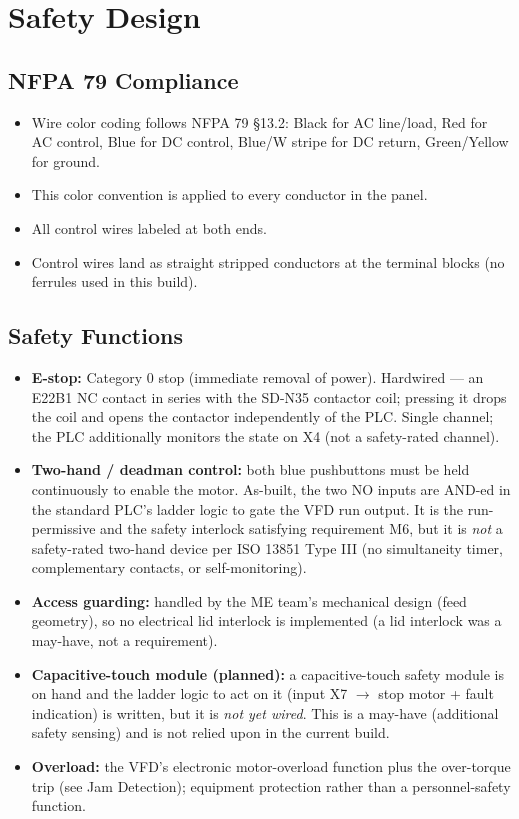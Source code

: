 \documentclass[hidelinks,12pt]{article}
\begin{document}
\section{Safety Design}

\subsection{NFPA 79 Compliance}
\begin{itemize}
    \item Wire color coding follows NFPA 79 §13.2: Black for AC line/load, Red for AC control, Blue for DC control, Blue/W stripe for DC return, Green/Yellow for ground.
    \item This color convention is applied to every conductor in the panel.
    \item All control wires labeled at both ends.
    \item Control wires land as straight stripped conductors at the terminal blocks (no ferrules used in this build).
\end{itemize}

\subsection{Safety Functions}
\begin{itemize}
    \item \textbf{E-stop:} Category 0 stop (immediate removal of power). Hardwired --- an E22B1 NC contact in series with the SD-N35 contactor coil; pressing it drops the coil and opens the contactor independently of the PLC. Single channel; the PLC additionally monitors the state on X4 (not a safety-rated channel).
    \item \textbf{Two-hand / deadman control:} both blue pushbuttons must be held continuously to enable the motor. As-built, the two NO inputs are AND-ed in the standard PLC's ladder logic to gate the VFD run output. It is the run-permissive and the safety interlock satisfying requirement M6, but it is \emph{not} a safety-rated two-hand device per ISO 13851 Type III (no simultaneity timer, complementary contacts, or self-monitoring).
    \item \textbf{Access guarding:} handled by the ME team's mechanical design (feed geometry), so no electrical lid interlock is implemented (a lid interlock was a may-have, not a requirement).
    \item \textbf{Capacitive-touch module (planned):} a capacitive-touch safety module is on hand and the ladder logic to act on it (input X7 $\rightarrow$ stop motor + fault indication) is written, but it is \emph{not yet wired}. This is a may-have (additional safety sensing) and is not relied upon in the current build.
    \item \textbf{Overload:} the VFD's electronic motor-overload function plus the over-torque trip (see Jam Detection); equipment protection rather than a personnel-safety function.
\end{itemize}
\end{document}
